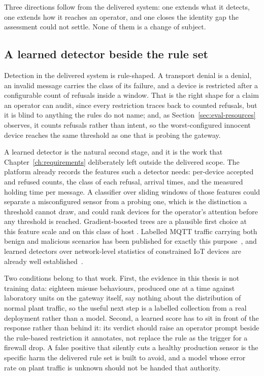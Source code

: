\documentclass[12pt,a4paper]{report}
\begin{document}
Three directions follow from the delivered system: one
extends what it detects, one extends how it reaches an
operator, and one closes the identity gap the assessment
could not settle. None of them is a change of subject.

\subsection{A learned detector beside the rule set}

Detection in the delivered system is rule-shaped. A transport
denial is a denial, an invalid message carries the class of
its failure, and a device is restricted after a configurable
count of refusals inside a window. That is the right shape
for a claim an operator can audit, since every restriction
traces back to counted refusals, but it is blind to anything
the rules do not name; and, as Section~\ref{sec:eval-resources}
observes, it counts refusals rather than intent, so the
worst-configured innocent device reaches the same threshold
as one that is probing the gateway.

A learned detector is the natural second stage, and it is
the work that Chapter~\ref{ch:requirements} deliberately left
outside the delivered scope. The platform already records the
features such a detector needs: per-device accepted and
refused counts, the class of each refusal, arrival times, and
the measured holding time per message. A classifier over
sliding windows of those features could separate a
misconfigured sensor from a probing one, which is the
distinction a threshold cannot draw, and could rank devices
for the operator's attention before any threshold is reached.
Gradient-boosted trees are a plausible first choice at this
feature scale and on this class of host \cite{lightgbm}.
Labelled MQTT traffic carrying both benign and malicious
scenarios has been published for exactly this
purpose~\cite{mqttset}, and learned detectors over
network-level statistics of constrained IoT devices are
already well established~\cite{nbaiot}.

Two conditions belong to that work. First, the evidence in
this thesis is not training data: eighteen misuse behaviours,
produced one at a time against laboratory units on the
gateway itself, say nothing about the distribution of normal
plant traffic, so the useful next step is a labelled
collection from a real deployment rather than a model.
Second, a learned score has to sit in front of the response
rather than behind it: its verdict should raise an operator
prompt beside the rule-based restriction it annotates, not
replace the rule as the trigger for a firewall drop. A false
positive that silently cuts a healthy production sensor is
the specific harm the delivered rule set is built to avoid,
and a model whose error rate on plant traffic is unknown
should not be handed that authority.
\end{document}
